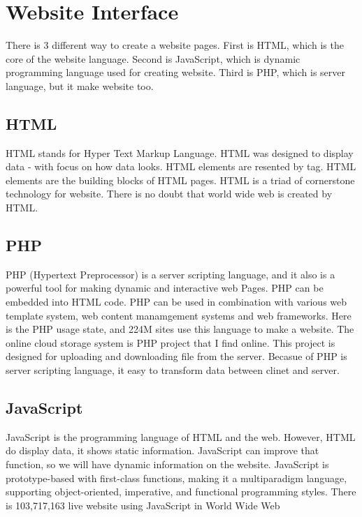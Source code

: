 \section{Website Interface}
There is 3 different way to create a website pages. First is HTML, which is the core of the website language. Second is JavaScript, which is dynamic programming language used for creating website. Third is PHP, which is server language, but it make website too.

\subsection{HTML}
HTML stands for Hyper Text Markup Language. HTML was designed to display data - with focus on how data looks. HTML elements are resented by tag. HTML elements are the building blocks of HTML pages. HTML is a triad of cornerstone technology for website. There is no doubt that world wide web is created by HTML.

\subsection{PHP}
PHP (Hypertext Preprocessor) is a server scripting language, and it also is a powerful tool for making dynamic and interactive web Pages. PHP can be embedded into HTML code. PHP can be used in combination with various web template system, web content manamgement systems and web frameworks. Here is the PHP usage state,\cite{PHP-usage} and 224M sites use this language to make a website. The online cloud storage system\cite{online_cloud} is PHP project that I find online. This project is designed for uploading and downloading file from the server. Becasue of PHP is server scripting language, it easy to transform data between clinet and server.

\subsection{JavaScript}
JavaScript is the programming language of HTML and the web. However, HTML do display data, it shows static information. JavaScript can improve that function, so we will have dynamic information on the website. JavaScript is prototype-based with first-class functions, making it a multiparadigm language, supporting object-oriented, imperative, and functional programming styles. There is 103,717,163 live website using JavaScript in World Wide Web \cite{javascript_state}

